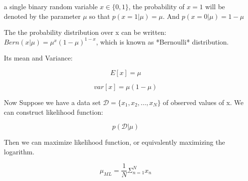 a single binary random variable $x\in \{0, 1\}$, the probability of $x = 1$ will be denoted by the parameter $\mu$ so that 
$p(x=1|\mu) = \mu$. And $p(x=0|\mu) = 1 - \mu$

The  the probability distribution over x can be written:
$Bern(x|\mu) = \mu^x(1-\mu)^{1-x}$, which is known as *Bernoulli* distribution.

Its mean and Variance:

$$E[x] = \mu$$

$$var[x] = \mu(1-\mu)$$

Now Suppose we have a data set $\mathcal{D} = \{x_1, x_2, \dots, x_N\}$ of observed values of x. We can construct likelihood function:

$$p(\mathcal{D}|\mu)$$

Then we can maximize likelihood function, or equivalently maximizing the logarithm.

$$\mu_{ML} = \frac{1}{N}\Sigma_{n=1}^{N}x_n$$